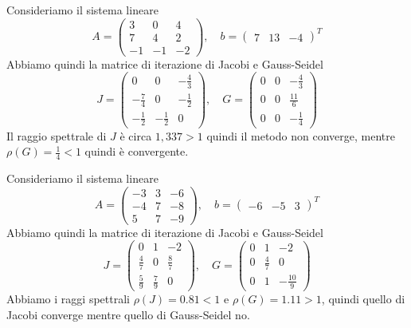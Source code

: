 \documentclass[a4paper]{article}
\begin{document}
\begin{snippetexample}{}
    Consideriamo il sistema lineare
    \[
        A =
        \begin{pmatrix}
            3 & 0 & 4 \\
            7 & 4 & 2 \\
            -1 & -1 & -2
        \end{pmatrix}, \quad b=
        \begin{pmatrix}
            7 & 13 & -4
        \end{pmatrix}^T
    \]
    Abbiamo quindi la matrice di iterazione di Jacobi e Gauss-Seidel
    \[
        J =
        \begin{pmatrix}
            0 & 0 & -\frac43 \\
            -\frac74 & 0 & -\frac12 \\
            -\frac12 & -\frac12 & 0
        \end{pmatrix}, \quad
        G =
        \begin{pmatrix}
            0 & 0 & -\frac43 \\
            0 & 0 & \frac{11}{6} \\
            0 & 0 & -\frac14
        \end{pmatrix}
    \]
    Il raggio spettrale di \(J\) è circa \(1,337 > 1\)
    quindi il metodo non converge, mentre
    \(\rho(G) = \frac14 < 1\) quindi è convergente.
\end{snippetexample}

\begin{snippetexample}{}
    Consideriamo il sistema lineare
    \[
        A =
        \begin{pmatrix}
            -3 & 3 & -6 \\
            -4 & 7 & -8 \\
            5 & 7 & -9
        \end{pmatrix}, \quad b=
        \begin{pmatrix}
            -6 & -5 & 3
        \end{pmatrix}^T
    \]
    Abbiamo quindi la matrice di iterazione di Jacobi e Gauss-Seidel
    \[
        J =
        \begin{pmatrix}
            0 & 1 & -2 \\
            \frac47 & 0 & \frac87 \\
            \frac59 & \frac79 & 0
        \end{pmatrix}, \quad
        G =
        \begin{pmatrix}
            0 & 1 & -2 \\
            0 & \frac47 & 0 \\
            0 & 1 & -\frac{10}{9}
        \end{pmatrix}
    \]
    Abbiamo i raggi spettrali \(\rho(J) = 0.81 < 1\)
    e \(\rho(G) = 1.11 > 1\), quindi quello di Jacobi converge mentre quello di Gauss-Seidel no.
\end{snippetexample}
\end{document}
